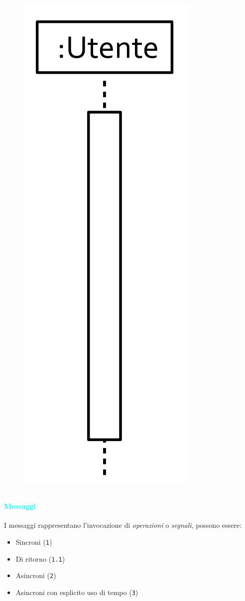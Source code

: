 \begin{figure}[H]
    \centering
    \includegraphics[scale=0.4]{img/sequenza.png}
\end{figure}

\paragraph{\textcolor{cyan}{Messaggi}} I messaggi rappresentano l'invocazione
di \emph{operazioni} o \emph{segnali}, possono essere:
\begin{itemize}
    \item Sincroni (\verb|1|)
    \item Di ritorno (\verb|1.1|)
    \item Asincroni (\verb|2|)
    \item Asincroni con esplicito uso di tempo (\verb|3|)
\end{itemize}

